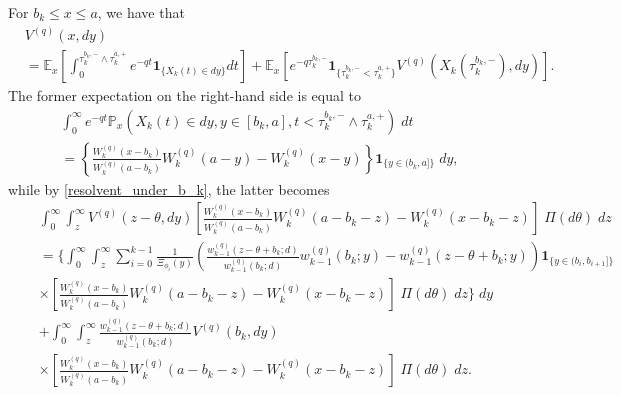 \documentclass[12pt,reqno]{amsart}
\theoremstyle{definition}
\theoremstyle{remark}
\newcommand{\p}{\mathbb{P}}
\newcommand{\e}{\mathbb{E}}
\newcommand{\ind}{\mathbf{1}}
\begin{document}
 For $b_k\leq x\leq a$, we have that
\begin{align*}
&V^{(q)}(x, dy)\\&=
\e_x\left[\int_0^{\tau_{k}^{b_k,-} \wedge \tau_{k}^{a,+} } e^{-qt}\ind_{\{X_k(t)\in dy \}}dt\right] + \e_x\left[ e^{-q \tau_{k}^{b_k,-} }\ind_{\{ \tau_{k}^{b_k,-} <\tau_{k}^{a,+}\}} V^{(q)}\left(X_k(\tau_{k}^{b_k,-} ), dy \right)\right].
 \end{align*}
 The former expectation on the right-hand side is equal to
 \begin{multline*}
\int_0^{\infty} e^{-qt} \p_x\left(X_k(t)\in dy, y\in [b_k,a], t<\tau_{k}^{b_k,-} \wedge \tau_{k}^{a,+}\right) \;dt  \\
=\left\{\frac{W_{k}^{(q)}(x-b_k)}{W_{k}^{(q)}(a-b_k)}W_{k}^{(q)}(a-y)-W_{k}^{(q)}(x-y)\right\}\ind_{\{y\in (b_k,a]\}}\;dy,
\end{multline*}
while by \eqref{resolvent_under_b_k}, the latter becomes
\begin{align*}
&\int_0^{\infty}\int_z^{\infty} V^{(q)}(z-\theta, dy) 
\left[\frac{W_{k}^{(q)}(x-b_k)}{W_{k}^{(q)}(a-b_k)}W_{k}^{(q)}(a-b_k-z)-W_{k}^{(q)}(x-b_k-z)\right]\;\Pi(d\theta)\;dz  \\
&=\Bigg\{\int_0^{\infty}\int_z^{\infty}\sum_{i=0}^{k-1}\frac{1}{\Xi_{\phi_i}(y)} \left( \frac{w_{k-1}^{(q)}(z-\theta+b_k;d)}
{w_{k-1}^{(q)}(b_k;d)}w_{k-1}^{(q)}(b_k;y)-w_{k-1}^{(q)}(z-\theta+b_k;y)\right)
\ind_{\{y\in (b_i,b_{i+1}]\}} \\ \quad &\times 
\left[\frac{W_{k}^{(q)}(x-b_k)}{W_{k}^{(q)}(a-b_k)}W_{k}^{(q)}(a-b_k-z)-W_{k}^{(q)}(x-b_k-z)\right]\;\Pi(d\theta)\;dz
\Bigg\} \;dy \\ &+
\int_0^{\infty}\int_z^{\infty}\frac{w_{k-1}^{(q)}(z-\theta+b_k;d)}{w^{(q)}_{k-1}(b_k;d)}V^{(q)}(b_k, dy)  \\
&\times\left[\frac{W_{k}^{(q)}(x-b_k)}{W_{k}^{(q)}(a-b_k)}W_{k}^{(q)}(a-b_k-z)-W_{k}^{(q)}(x-b_k-z)\right]\;\Pi(d\theta)\;dz.
\end{align*}
\end{document}
